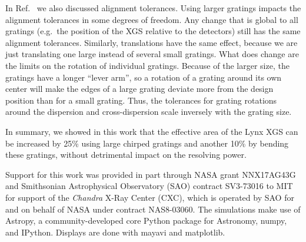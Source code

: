 \documentclass[]{spie}  %
\begin{document}
In Ref.~ we also discussed alignment tolerances. Using larger gratings impacts the alignment tolerances in some degrees of freedom. Any change that is global to all gratings (e.g.\ the position of the XGS relative to the detectors) still has the same alignment tolerances. Similarly, translations have the same effect, because we are just translating one large instead of several small gratings. What does change are the limits on the rotation of individual gratings. Because of the larger size, the gratings have a longer ``lever arm'', so a rotation of a grating around its own center will make the edges of a large grating deviate more from the design position than for a small grating. Thus, the tolerances for grating rotations around the dispersion and cross-dispersion scale inversely with the grating size.

In summary, we showed in this work that the effective area of the Lynx XGS can be increased by 25\% using large chirped gratings and another 10\% by bending these gratings, without detrimental impact on the resolving power. 


\acknowledgments %
Support
for this work was provided in part through NASA grant NNX17AG43G and
Smithsonian Astrophysical Observatory (SAO) contract SV3-73016 to MIT
for support of the {\em Chandra} X-Ray Center (CXC), which is operated
by SAO for and on behalf of NASA under contract NAS8-03060.  The
simulations make use of Astropy, a community-developed core Python
package for Astronomy\cite{astropy1,astropy2}, numpy\cite{numpy}, and
IPython\cite{IPython}. Displays are done with mayavi\cite{mayavi} and
matplotlib\cite{matplotlib}.


\end{document}
